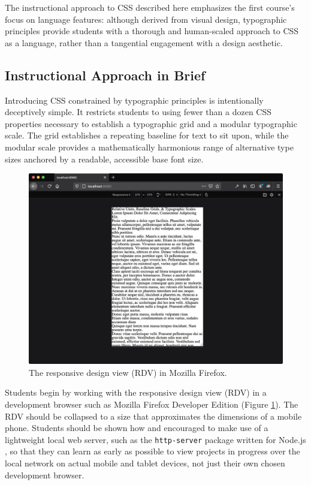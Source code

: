 \documentclass[sigconf,sigplan,review,anonymous]{acmart}
\begin{document}
The instructional approach to CSS described here emphasizes the first course’s focus on language features: although derived from visual design, typographic principles provide students with a thorough and human-scaled approach to CSS as a language, rather than a tangential engagement with a design aesthetic.

\subsection{Instructional Approach in Brief}

Introducing CSS constrained by typographic principles is intentionally deceptively simple. It restricts students to using fewer than a dozen CSS properties necessary to establish a typographic grid and a modular typographic scale. The grid establishes a repeating baseline for text to sit upon, while the modular scale provides a mathematically harmonious range of alternative type sizes anchored by a readable, accessible base font size.

\begin{figure}
  \includegraphics[width=\linewidth]{rdv}
  \caption{The responsive design view (RDV) in Mozilla Firefox.}
  \label{fig:rdv}
\end{figure}

Students begin by working with the responsive design view (RDV) in a development browser such as Mozilla Firefox Developer Edition (Figure \ref{fig:rdv}). The RDV should be collapsed to a size that approximates the dimensions of a mobile phone. Students should be shown how and encouraged to make use of a lightweight local web server, such as the \verb|http-server| package written for Node.js \cite{npm:http}, so that they can learn as early as possible to view projects in progress over the local network on actual mobile and tablet devices, not just their own chosen development browser.
\end{document}
